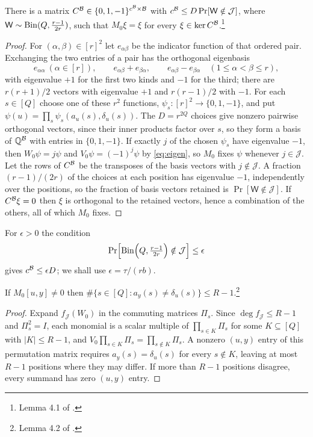 \begin{lemma}\label{lem:CB}
There is a matrix $C^{\mathcal{B}}\in\{0,1,-1\}^{c^{\mathcal{B}}\times\mathcal{B}}$ with
$c^{\mathcal{B}}\le D\Pr[\mathsf W\notin\mathcal J]$, where $\mathsf W\sim\operatorname{Bin}(Q,\frac{r-1}{2r})$,
such that $M_0\xi=\xi$ for every $\xi\in\ker C^{\mathcal{B}}$.\footnote{Lemma 4.1 of
\cite{OAI26}.}
\end{lemma}

\begin{proof}
For $(\alpha,\beta)\in[r]^2$ let $e_{\alpha\beta}$ be the indicator function of
that ordered pair. Exchanging the two entries of a pair has the orthogonal
eigenbasis
\[
  e_{\alpha\alpha}\ (\alpha\in[r]),\qquad e_{\alpha\beta}+e_{\beta\alpha},\qquad
  e_{\alpha\beta}-e_{\beta\alpha}\quad(1\le\alpha<\beta\le r),
\]
with eigenvalue $+1$ for the first two kinds and $-1$ for the third; there are
$r(r+1)/2$ vectors with eigenvalue $+1$ and $r(r-1)/2$ with $-1$. For each
$s\in[Q]$ choose one of these $r^2$ functions, $\psi_s:[r]^2\to\{0,1,-1\}$, and
put $\psi(u)=\prod_{s}\psi_s(a_u(s),\delta_u(s))$. The $D=r^{2Q}$ choices give
nonzero pairwise orthogonal vectors, since their inner products factor over $s$,
so they form a basis of $\mathbb{Q}^{\mathcal{B}}$ with entries in $\{0,1,-1\}$. If exactly $j$ of
the chosen $\psi_s$ have eigenvalue $-1$, then $W_0\psi=j\psi$ and
$V_0\psi=(-1)^j\psi$ by \eqref{eq:eigen}, so $M_0$ fixes $\psi$ whenever
$j\in\mathcal J$. Let the rows of $C^{\mathcal{B}}$ be the transposes of the basis vectors
with $j\notin\mathcal J$. A fraction $(r-1)/(2r)$ of the choices at each position
has eigenvalue $-1$, independently over the positions, so the fraction of basis
vectors retained is $\Pr[\mathsf W\notin\mathcal J]$. If $C^{\mathcal{B}}\xi=0$ then $\xi$
is orthogonal to the retained vectors, hence a combination of the others, all of
which $M_0$ fixes.
\end{proof}

For $\epsilon>0$ the condition
\begin{equation}\label{eq:tail}
  \Pr\Bigl[\operatorname{Bin}\Bigl(Q,\tfrac{r-1}{2r}\Bigr)\notin\mathcal J\Bigr]\le\epsilon
\end{equation}
gives $c^{\mathcal{B}}\le\epsilon D$; we shall use $\epsilon=\tau/(rb)$.

\begin{lemma}\label{lem:mismatch}
If $M_0[u,y]\ne0$ then $\#\{s\in[Q]:a_y(s)\ne\delta_u(s)\}\le R-1$.\footnote{Lemma
4.2 of \cite{OAI26}.}
\end{lemma}

\begin{proof}
Expand $f_{\mathcal J}(W_0)$ in the commuting matrices $\Pi_s$. Since
$\deg f_{\mathcal J}\le R-1$ and $\Pi_s^2=I$, each monomial is a scalar multiple
of $\prod_{s\in K}\Pi_s$ for some $K\subseteq[Q]$ with $|K|\le R-1$, and
$V_0\prod_{s\in K}\Pi_s=\prod_{s\notin K}\Pi_s$. A nonzero $(u,y)$ entry of this
permutation matrix requires $a_y(s)=\delta_u(s)$ for every $s\notin K$, leaving at
most $R-1$ positions where they may differ. If more than $R-1$ positions disagree,
every summand has zero $(u,y)$ entry.
\end{proof}

